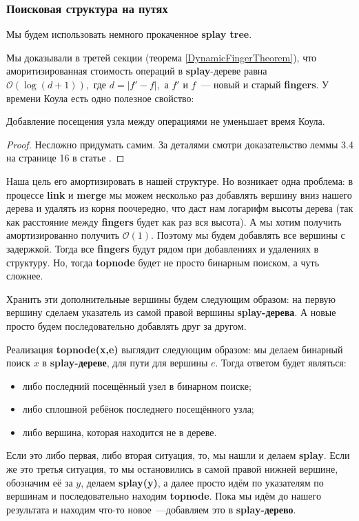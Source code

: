 \subsubsection{Поисковая структура на путях}
Мы будем использовать немного прокаченное \textbf{splay tree}. 

Мы доказывали в третей секции (теорема \ref{DynamicFingerTheorem}), что аморитизированная стоимость операций в \textbf{splay}-дереве равна $\mathcal{O}(\log{(d + 1)}),$ где $d = |f' - f|,$ а $f'$ и $f$~--- новый и старый \textbf{fingers}.
У времени Коула есть одно полезное свойство:
\begin{lemma}
Добавление посещения узла между операциями не уменьшает время Коула.
\end{lemma}
\begin{proof}
Несложно придумать самим. За деталями смотри доказательство леммы 3.4 на странице 16 в статье \cite{georgiadis2011data}.
\end{proof}
Наша цель его амортизировать в нашей структуре. Но возникает одна проблема: в процессе \textbf{link} и \textbf{merge} мы можем несколько раз добавлять вершину вниз нашего дерева и удалять из корня поочередно, что даст нам логарифм высоты дерева (так как расстояние между \textbf{fingers} будет как раз вся высота). А мы хотим получить амортизированно получить $\mathcal{O}(1).$ Поэтому мы будем добавлять все вершины с задержкой. Тогда все \textbf{fingers} будут рядом при добавлениях и удалениях в структуру. Но, тогда \textbf{topnode} будет не просто бинарным поиском, а чуть сложнее.

Хранить эти дополнительные вершины будем следующим образом: на первую вершину сделаем указатель из самой правой вершины \textbf{splay-дерева}. А новые просто будем последовательно добавлять друг за другом.

Реализация \textbf{topnode(x,e)} выглядит следующим образом: мы делаем бинарный поиск $x$ в \textbf{splay-дереве}, для пути для вершины $e$. Тогда ответом будет являться:
\begin{itemize}
    \item либо последний посещённый узел в бинарном поиске;
    \item либо сплошной ребёнок последнего посещённого узла;
    \item либо вершина, которая находится не в дереве.
\end{itemize}
Если это либо первая, либо вторая ситуация, то, мы нашли и делаем \textbf{splay}. Если же это третья ситуация, то мы остановились в самой правой нижней вершине, обозначим её за $y$, делаем \textbf{splay(y)}, а далее просто идём по указателям по вершинам и последовательно находим \textbf{topnode}. Пока мы идём до нашего результата и находим что-то новое~---добавляем это в \textbf{splay-дерево}.

